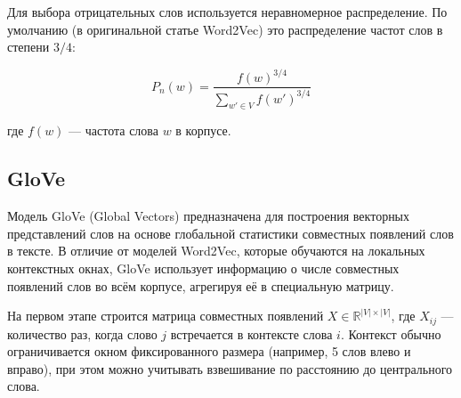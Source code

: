 \documentclass[coursework]{SCWorks}
\begin{document}
Для выбора отрицательных слов используется неравномерное распределение. По умолчанию (в оригинальной статье Word2Vec) это распределение частот слов в степени $3/4$:

\[
P_n(w) = \frac{f(w)^{3/4}}{\sum_{w' \in V} f(w')^{3/4}}
\]

где $f(w)$ — частота слова $w$ в корпусе.



  
\subsection{GloVe}


Модель GloVe (Global Vectors) предназначена для построения векторных представлений слов на основе глобальной статистики совместных появлений слов в тексте. В отличие от моделей Word2Vec, которые обучаются на локальных контекстных окнах, GloVe использует информацию о числе совместных появлений слов во всём корпусе, агрегируя её в специальную матрицу.

На первом этапе строится матрица совместных появлений $X \in \mathbb{R}^{|V| \times |V|}$, где $X_{ij}$ — количество раз, когда слово $j$ встречается в контексте слова $i$. Контекст обычно ограничивается окном фиксированного размера (например, 5 слов влево и вправо), при этом можно учитывать взвешивание по расстоянию до центрального слова.
\end{document}
